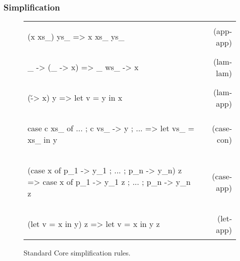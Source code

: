 \documentclass[preprint]{sigplanconf}
\begin{document}
\subsubsection{Simplification}

\newcommand{\simp}[2]{\vspace{-7mm} #2 & (#1) \\}
\newenvironment{simplify}
    {\begin{flushright}
     \begin{tabular}{p{6.5cm}r}
    }
    {\end{tabular}
     \vspace{-7mm}
     \end{flushright}
    }

\begin{figure}
\begin{simplify}

\simp{app-app}{
\begin{code}
(x xs_) ys_
    => x xs_ ys_
\end{code}}

\simp{lam-lam}{
\begin{code}
\vs_ -> (\ws_ -> x)
    => \vs_ ws_ -> x
\end{code}}

\simp{lam-app}{
\begin{code}
(\v -> x) y
    => let v = y in x
\end{code}}

\simp{case-con}{
\begin{code}
case c xs_ of {... ; c vs_ -> y ; ...}
    => let vs_ = xs_ in y
\end{code}}

\simp{case-app}{
\begin{code}
(case x of {p_1 -> y_1 ; ... ; p_n -> y_n}) z
    => case x of {p_1 -> y_1 z ; ... ; p_n -> y_n z}
\end{code}}

\simp{let-app}{
\begin{code}
(let v = x in y) z
    => let v = x in y z
\end{code}}

\end{simplify}
\caption{Standard Core simplification rules.}
\label{fig:simplify}
\end{figure}
\end{document}
